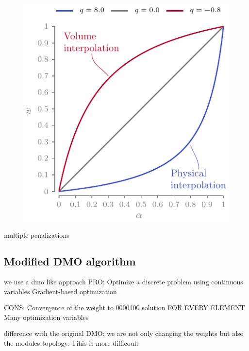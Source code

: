 \begin{figure}
    \centering
    \includegraphics{figures/06_DMO/00_ramp/ramp.pdf}
    \caption{}
    \label{fig:06_ramp}
\end{figure}

multiple penalizations


\subsection{Modified DMO algorithm}
we use a dmo like approach
PRO:
Optimize a discrete problem using continuous variables
Gradient-based optimization

CONS:
Convergence of the weight to 0000100 solution FOR EVERY ELEMENT
Many optimization variables

difference with the original DMO; we are not only changing the weights but also the modules topology. Tihis is more difficoult


